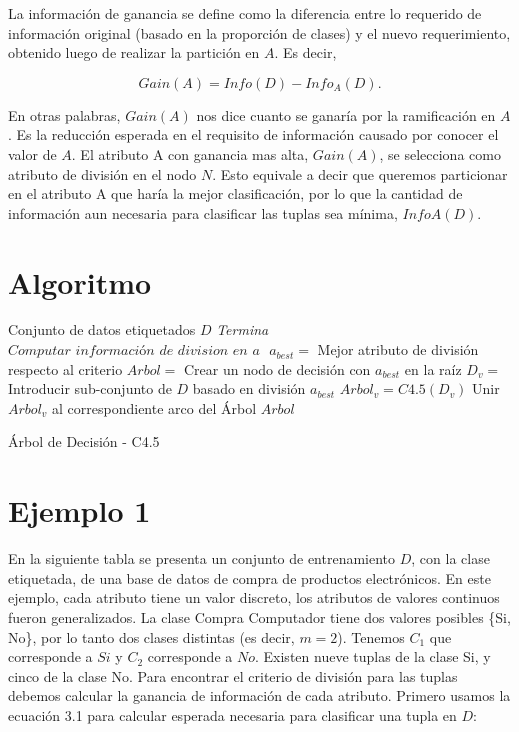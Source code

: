 La información de ganancia se define como la diferencia entre lo requerido
de información original (basado en la proporción de clases) y el nuevo
requerimiento, obtenido luego de realizar la partición en $A$. Es
decir,

\begin{equation}
Gain(A)=Info(D)-Info_{A}(D).
\end{equation}

En otras palabras, $Gain(A)$ nos dice cuanto se ganaría por la ramificación
en $A$. Es la reducción esperada en el requisito de información causado
por conocer el valor de $A$. El atributo A con ganancia mas alta,
$Gain(A)$, se selecciona como atributo de división en el nodo $N$.
Esto equivale a decir que queremos particionar en el atributo A que
haría la mejor clasificación, por lo que la cantidad de información
aun necesaria para clasificar las tuplas sea mínima, $InfoA(D)$.

\section{Algoritmo}

\begin{algorithm}
\begin{algorithmic}[1]
	\Require Conjunto de datos etiquetados $D$
 			\State\textit{Termina}
		\EndIf
			\State $\textit{Computar información de division en a }$
		\EndFor
		\State $ a_{best} =$ Mejor atributo de división respecto al criterio
 		\State $ Arbol =$ Crear un nodo de decisión con $ a_{best} $ en la raíz
 		\State $ D_{v} =$ Introducir sub-conjunto de $D$ basado en división $ a_{best} $
			\State $ Arbol_{v} = C4.5(D_{v}) $
			\State Unir $ Arbol_{v} $ al correspondiente arco del Árbol
		\EndFor
		\State
 		\Return $ Arbol $
	\EndProcedure
\end{algorithmic}

\caption{\label{algoC45}Árbol de Decisión - C4.5}
\end{algorithm}


\section{Ejemplo 1}

En la siguiente tabla se presenta un conjunto de entrenamiento $D$,
con la clase etiquetada, de una base de datos de compra de productos
electrónicos. En este ejemplo, cada atributo tiene un valor discreto,
los atributos de valores continuos fueron generalizados. La clase
\textquotedbl{}Compra Computador\textquotedbl{} tiene dos valores
posibles \{Si, No\}, por lo tanto dos clases distintas (es decir,
$m=2$). Tenemos $C_{1}$ que corresponde a $Si$ y $C_{2}$ corresponde
a $No$. Existen nueve tuplas de la clase \textquotedbl{}Si\textquotedbl{},
y cinco de la clase \textquotedbl{}No\textquotedbl{}. Para encontrar
el criterio de división para las tuplas debemos calcular la ganancia
de información de cada atributo. Primero usamos la ecuación 3.1 para
calcular esperada necesaria para clasificar una tupla en $D$:

